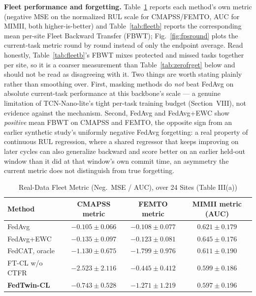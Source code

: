 \documentclass[journal]{IEEEtran}
\begin{document}
\textbf{Fleet performance and forgetting.} Table~\ref{tab:fleeta} reports each method's own metric (negative MSE on the normalized RUL scale for CMAPSS/FEMTO, AUC for MIMII, both higher-is-better) and Table~\ref{tab:fleetb} reports the corresponding mean per-site Fleet Backward Transfer (FBWT); Fig.~\ref{fig:fpsround} plots the current-task metric round by round instead of only the endpoint average. Read honestly, Table~\ref{tab:fleetb}'s FBWT mixes protected and missed tasks together per site, so it is a coarser measurement than Table~\ref{tab:zerofrget} below and should not be read as disagreeing with it. Two things are worth stating plainly rather than smoothing over. First, masking methods do \emph{not} beat FedAvg on absolute current-task performance at this backbone's scale — a genuine limitation of TCN-Nano-lite's tight per-task training budget (Section~VIII), not evidence against the mechanism. Second, FedAvg and FedAvg+EWC show \emph{positive} mean FBWT on CMAPSS and FEMTO, the opposite sign from an earlier synthetic study's uniformly negative FedAvg forgetting: a real property of continuous RUL regression, where a shared regressor that keeps improving on later cycles can also generalize backward and score better on an earlier held-out window than it did at that window's own commit time, an asymmetry the current metric does not distinguish from true forgetting.

\begin{table}[H]
\centering
\caption{Real-Data Fleet Metric (Neg.\ MSE / AUC), over 24 Sites (Table III(a))}
\label{tab:fleeta}
\scriptsize
\setlength{\tabcolsep}{3pt}
\begin{tabular}{@{}lccc@{}}
\toprule
Method & CMAPSS metric & FEMTO metric & MIMII metric (AUC) \\
\midrule
FedAvg & $-0.105{\pm}0.066$ & $-0.108{\pm}0.077$ & $0.621{\pm}0.179$ \\
FedAvg+EWC & $-0.135{\pm}0.097$ & $-0.123{\pm}0.081$ & $0.645{\pm}0.176$ \\
FedCAT, oracle & $-1.130{\pm}0.675$ & $-1.799{\pm}0.976$ & $0.611{\pm}0.190$ \\
FT-CL w/o CTFR & $-2.523{\pm}2.116$ & $-0.445{\pm}0.412$ & $0.599{\pm}0.186$ \\
\textbf{FedTwin-CL} & $-0.743{\pm}0.528$ & $-1.271{\pm}1.219$ & $0.597{\pm}0.196$ \\
\bottomrule
\end{tabular}
\end{table}
\end{document}
